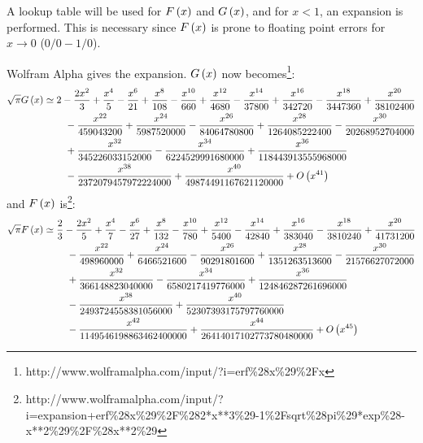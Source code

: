 \documentclass[12pt,letterpaper]{article}
\newcommand{\url}[1]{{\color{blue}#1}}
\begin{document}
A lookup table will be used for $F\left( x \right)$ and $G\left( x \right)$, and for $x<1$, an expansion is
performed. This is necessary since $F\left( x \right)$ is prone to floating point errors
for $x \rightarrow 0$ ($0/0 - 1/0$).

Wolfram Alpha gives the expansion. $G\left( x \right)$ now
becomes\footnote{\url{http://www.wolframalpha.com/input/?i=erf\%28x\%29\%2Fx}}:
\begin{align}
\sqrt{\pi} G\left( x \right) & \simeq
      2
    - \frac{2 x^{2}}{3}
    + \frac{x^{4}}{5}
    - \frac{x^{6}}{21}
    + \frac{x^{8}}{108}
    - \frac{x^{10}}{660}
    + \frac{x^{12}}{4680}
    - \frac{x^{14}}{37800}
    + \frac{x^{16}}{342720}
    - \frac{x^{18}}{3447360}
    + \frac{x^{20}}{38102400}
\nonumber \\ & \hspace{22pt}
    - \frac{x^{22}}{459043200}
    + \frac{x^{24}}{5987520000}
    - \frac{x^{26}}{84064780800}
    + \frac{x^{28}}{1264085222400}
    - \frac{x^{30}}{20268952704000}
\nonumber \\ & \hspace{22pt}
    + \frac{x^{32}}{345226033152000}
    - \frac{x^{34}}{6224529991680000}
    + \frac{x^{36}}{118443913555968000}
\nonumber \\ & \hspace{22pt}
    - \frac{x^{38}}{2372079457972224000}
    + \frac{x^{40}}{49874491167621120000}
    + O\left( x^{41} \right)
\end{align}
and $F\left( x \right)$
is\footnote{\url{http://www.wolframalpha.com/input/?i=expansion+erf\%28x\%29\%2F\%282*x**3\%29-1\%2Fsqrt\%28pi\%29*exp\%28-x**2\%29\%2F\%28x**2\%29}}:
\begin{align}
\sqrt{\pi} F\left( x \right) & \simeq
      \frac{2}{3}
    - \frac{2 x^{2}}{5}
    + \frac{x^{4}}{7}
    - \frac{x^{6}}{27}
    + \frac{x^{8}}{132}
    - \frac{x^{10}}{780}
    + \frac{x^{12}}{5400}
    - \frac{x^{14}}{42840}
    + \frac{x^{16}}{383040}
    - \frac{x^{18}}{3810240}
    + \frac{x^{20}}{41731200}
\nonumber \\ & \hspace{24pt}
    - \frac{x^{22}}{498960000}
    + \frac{x^{24}}{6466521600}
    - \frac{x^{26}}{90291801600}
    + \frac{x^{28}}{1351263513600}
    - \frac{x^{30}}{21576627072000}
\nonumber \\ & \hspace{24pt}
    + \frac{x^{32}}{366148823040000}
    - \frac{x^{34}}{6580217419776000}
    + \frac{x^{36}}{124846287261696000}
\nonumber \\ & \hspace{24pt}
    - \frac{x^{38}}{2493724558381056000}
    + \frac{x^{40}}{52307393175797760000}
\nonumber \\ & \hspace{24pt}
    - \frac{x^{42}}{1149546198863462400000}
    + \frac{x^{44}}{26414017102773780480000}
    +O\left( x^{45} \right)
\end{align}
\end{document}

